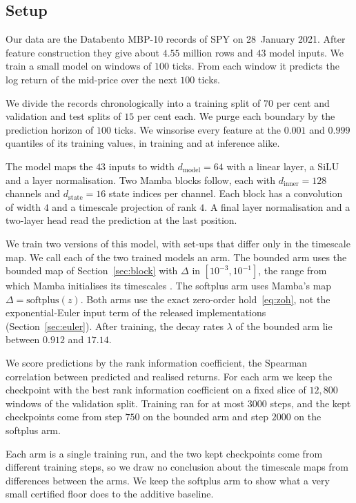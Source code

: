 \documentclass[11pt, a4paper]{article}
\theoremstyle{remark}
\theoremstyle{plain}
\begin{document}
\subsection{Setup}
\label{sec:exp-setup}

Our data are
the Databento MBP-10 records of SPY on 28~January 2021. After feature construction they give about
$4.55$ million rows and $43$ model inputs. We train a small model on windows of $100$ ticks. From
each window it predicts the log return of the mid-price over the next $100$ ticks.

We divide the records chronologically into a training split of $70$ per cent and validation and
test splits of $15$ per cent each. We purge each boundary by the prediction horizon of $100$
ticks. We winsorise every feature at the $0.001$ and $0.999$ quantiles of its training values, in
training and at inference alike.

The model maps the $43$ inputs to width $d_{\mathrm{model}} = 64$ with a linear layer, a SiLU and a
layer normalisation. Two Mamba blocks follow, each with $d_{\mathrm{inner}} = 128$ channels and
$d_{\mathrm{state}} = 16$ state indices per channel. Each block has a convolution of width $4$ and
a timescale projection of rank $4$. A final layer normalisation and a two-layer head read the
prediction at the last position.

We train two versions of this model, with set-ups that differ only in the timescale map. We call
each of the two trained models an arm. The bounded arm uses the bounded map of
Section~\ref{sec:block} with $\Delta$ in $[10^{-3}, 10^{-1}]$, the range from which Mamba
initialises its timescales \citep{gu2023mamba}. The softplus arm uses Mamba's map
$\Delta = \mathrm{softplus}(z)$. Both arms use the exact zero-order hold~\eqref{eq:zoh}, not the
exponential-Euler input term of the released implementations (Section~\ref{sec:euler}). After
training, the decay rates $\lambda$ of the bounded arm lie between $0.912$ and $17.14$.

We score predictions by the rank information coefficient, the Spearman correlation between
predicted and realised returns. For each arm we keep the checkpoint with the best rank information
coefficient on a fixed slice of $12{,}800$ windows of the validation split. Training ran for
at most $3000$ steps, and the kept checkpoints come from step $750$ on the bounded arm and step
$2000$ on the softplus arm.

Each arm is a single training run, and the two kept checkpoints come from different training
steps, so we draw no conclusion about the timescale maps from differences between the arms. We
keep the softplus arm to show what a very small certified floor does to the additive
baseline.
\end{document}
